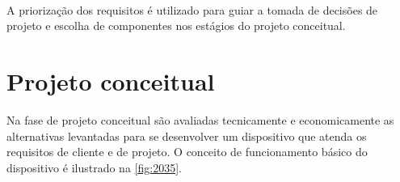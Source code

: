 \begin{table}[!ht]
    \caption{Prioridade dos requisitos definidos pela matriz QFD}
    \label{tab:resultqfd}
    \centering
\
\end{table}

A priorização dos requisitos é utilizado para guiar a tomada de decisões de projeto e escolha de componentes nos estágios do projeto conceitual.

\section{Projeto conceitual}


Na fase de projeto conceitual são avaliadas tecnicamente e economicamente as alternativas levantadas para se desenvolver um dispositivo que atenda os requisitos de cliente e de projeto.
O conceito de funcionamento básico do dispositivo é ilustrado na \autoref{fig:2035}.


